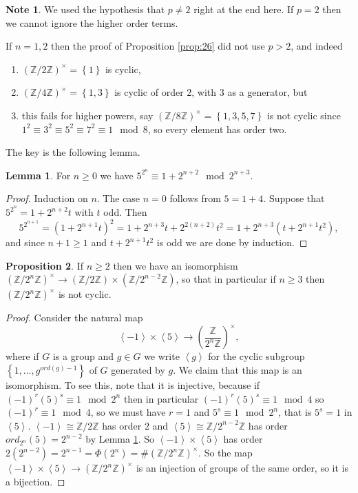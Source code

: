 \documentclass{article}
\newcommand{\Z}{\mathbb{Z}}
\newcommand{\rb}[1]{\left( #1 \right)}
\newcommand{\cb}[1]{\left\{ #1 \right\}}
\newcommand{\ab}[1]{\left\langle #1 \right\rangle}
\newcommand{\unit}[1]{\rb{\Z / #1\Z}^\times}
\theoremstyle{definition}\newtheorem{definition}{Definition}
\theoremstyle{definition}\newtheorem{remark}[definition]{Remark}
\theoremstyle{definition}\newtheorem*{example}{Example}
\theoremstyle{definition}\newtheorem*{note}{Note}
\newtheorem{proposition}[definition]{Proposition}
\newtheorem{lemma}[definition]{Lemma}
\begin{document}
\begin{note}
We used the hypothesis that $ p \ne 2 $ right at the end here. If $ p = 2 $ then we cannot ignore the higher order terms.
\end{note}

If $ n = 1, 2 $ then the proof of Proposition \ref{prop:26} did not use $ p > 2 $, and indeed
\begin{enumerate}
\item $ \unit{2} = \cb{1} $ is cyclic,
\item $ \unit{4} = \cb{1, 3} $ is cyclic of order $ 2 $, with $ 3 $ as a generator, but
\item this fails for higher powers, say $ \unit{8} = \cb{1, 3, 5, 7} $ is not cyclic since $ 1^2 \equiv 3^2 \equiv 5^2 \equiv 7^2 \equiv 1 \mod 8 $, so every element has order two.
\end{enumerate}
The key is the following lemma.

\begin{lemma}
\label{lem:27}
For $ n \ge 0 $ we have $ 5^{2^n} \equiv 1 + 2^{n + 2} \mod 2^{n + 3} $.
\end{lemma}

\begin{proof}
Induction on $ n $. The case $ n = 0 $ follows from $ 5 = 1 + 4 $. Suppose that $ 5^{2^n} = 1 + 2^{n + 2}t $ with $ t $ odd. Then
$$ 5^{2^{n + 1}} = \rb{1 + 2^{n + 1}t}^2 = 1 + 2^{n + 3}t + 2^{2\rb{n + 2}}t^2 = 1 + 2^{n + 3}\rb{t + 2^{n + 1}t^2}, $$
and since $ n + 1 \ge 1 $ and $ t + 2^{n + 1}t^2 $ is odd we are done by induction.
\end{proof}

\begin{proposition}
If $ n \ge 2 $ then we have an isomorphism $ \unit{2^n} \to \rb{\Z / 2\Z} \times \rb{\Z / 2^{n - 2}\Z} $, so that in particular if $ n \ge 3 $ then $ \unit{2^n} $ is not cyclic.
\end{proposition}

\begin{proof}
Consider the natural map
$$ \ab{-1} \times \ab{5} \to \rb{\dfrac{\Z}{2^n\Z}}^\times, $$
where if $ G $ is a group and $ g \in G $ we write $ \ab{g} $ for the cyclic subgroup $ \cb{1, \dots, g^{ord\rb{g} - 1}} $ of $ G $ generated by $ g $. We claim that this map is an isomorphism. To see this, note that it is injective, because if $ \rb{-1}^r\rb{5}^s \equiv 1 \mod 2^n $ then in particular $ \rb{-1}^r\rb{5}^s \equiv 1 \mod 4 $ so $ \rb{-1}^r \equiv 1 \mod 4 $, so we must have $ r = 1 $ and $ 5^s \equiv 1 \mod 2^n $, that is $ 5^s = 1 $ in $ \ab{5} $. $ \ab{-1} \cong \Z / 2\Z $ has order $ 2 $ and $ \ab{5} \cong \Z / 2^{n - 2}\Z $ has order $ ord_{2^n}\rb{5} = 2^{n - 2} $ by Lemma \ref{lem:27}. So $ \ab{-1} \times \ab{5} $ has order $ 2\rb{2^{n - 2}} = 2^{n - 1} = \Phi\rb{2^n} = \#\unit{2^n} $. So the map $ \ab{-1} \times \ab{5} \to \unit{2^n} $ is an injection of groups of the same order, so it is a bijection.
\end{proof}
\end{document}
